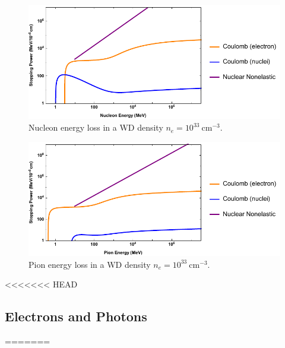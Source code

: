 \documentclass[twocolumn,showpacs,preprintnumbers,amsmath,amssymb,prd]{revtex4}
\begin{document}
\begin{figure}
\includegraphics[scale=.60]{SPnucleon.pdf}
\caption{Nucleon energy loss in a WD density $n_e = 10^{33} ~\text{cm}^{-3}$.}
\label{fig:SPnuc}
\end{figure}

\begin{figure}
\includegraphics[scale=.60]{SPpion.pdf}
\caption{Pion energy loss in a WD density $n_e = 10^{33} ~\text{cm}^{-3}$.}
\label{fig:SPpion}
\end{figure}

<<<<<<< HEAD
\subsection{Electrons and Photons}
=======
\end{document}
